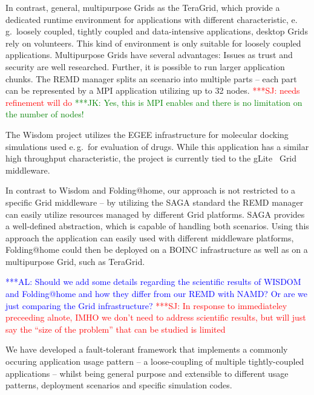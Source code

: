 \documentclass[times, 10pt, twocolumn]{article}
\newcommand{\kimnote}[1]{ {\textcolor{green} { ***JK: #1 }}}
\newcommand{\alnote}[1]{ {\textcolor{blue} { ***AL: #1 }}}
\newcommand{\jhanote}[1]{ {\textcolor{red} { ***SJ: #1 }}}
\newcommand{\kimnote}[1]{}
\newcommand{\alnote}[1]{}
\newcommand{\jhanote}[1]{}
\begin{document}
In contrast, general, multipurpose Grids as the TeraGrid, which
provide a dedicated runtime environment for applications with
different characteristic, e.\,g.\ loosely coupled, tightly coupled and
data-intensive applications, desktop Grids rely on volunteers. This
kind of environment is only suitable for loosely coupled
applications. Multipurpose Grids have several advantages: Issues as
trust and security are well researched. Further, it is possible to run
larger application chunks. The REMD manager splits an scenario into
multiple parts -- each part can be represented by a MPI application
utilizing up to 32 nodes. \jhanote{needs refinement will do}
\kimnote{Yes, this is MPI enables and there is no limitation on the
  number of nodes!}

The Wisdom project utilizes the EGEE infrastructure for molecular
docking simulations used e.\,g.\ for evaluation of drugs. While this
application has a similar high throughput characteristic, the project
is currently tied to the gLite~\cite{glite2008} Grid middleware.

In contrast to Wisdom and Folding@home, our approach is not restricted
to a specific Grid middleware -- by utilizing the SAGA standard the
REMD manager can easily utilize resources managed by different Grid
platforms. SAGA provides a well-defined abstraction, which is capable
of handling both scenarios. Using this approach the application can
easily used with different middleware platforms, Folding@home could
then be deployed on a BOINC infrastructure as well as on a
multipurpose Grid, such as TeraGrid.

\alnote{Should we add some details regarding the scientific results of
  WISDOM and Folding@home and how they differ from our REMD with NAMD?
  Or are we just comparing the Grid infrastructure?}  \jhanote{In
  response to immediateley preceeding alnote, IMHO we don't need to
  address scientific results, but will just say the ``size of the
  problem'' that can be studied is limited}



% 


We have developed a fault-tolerant framework that implements a
commonly occuring application usage pattern -- a loose-coupling of
multiple tightly-coupled applications -- whilst being general purpose
and extensible to different usage patterns, deployment scenarios and
specific simulation codes.
\end{document}
